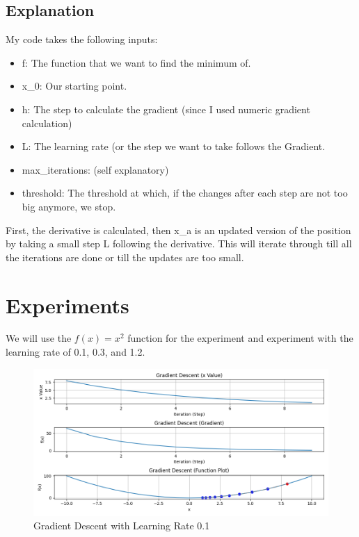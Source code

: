 \documentclass{article}
\begin{document}
\subsection{Explanation}
My code takes the following inputs:
\begin{itemize}
    \item f: The function that we want to find the minimum of.
    \item x\_0: Our starting point.
    \item h: The step to calculate the gradient (since I used numeric gradient calculation)
    \item L: The learning rate (or the step we want to take follows the Gradient.
    \item max\_iterations: (self explanatory)
    \item threshold: The threshold at which, if the changes after each step are not too big anymore, we stop.
\end{itemize}

\noindent First, the derivative is calculated, then x\_a is an updated version of the position by taking a small step L following the derivative. This will iterate through till all the iterations are done or till the updates are too small.

\section{Experiments}
We will use the $f(x) = x^2$ function for the experiment and experiment with the learning rate of 0.1, 0.3, and 1.2.

\begin{figure}[ht!]
  \centering
  \includegraphics[width=1\textwidth]{images/lab1/gradient_descent_lr(0.1).png}
  \caption{Gradient Descent with Learning Rate 0.1}
  \label{fig:lr_0.1}
\end{figure}
\end{document}
